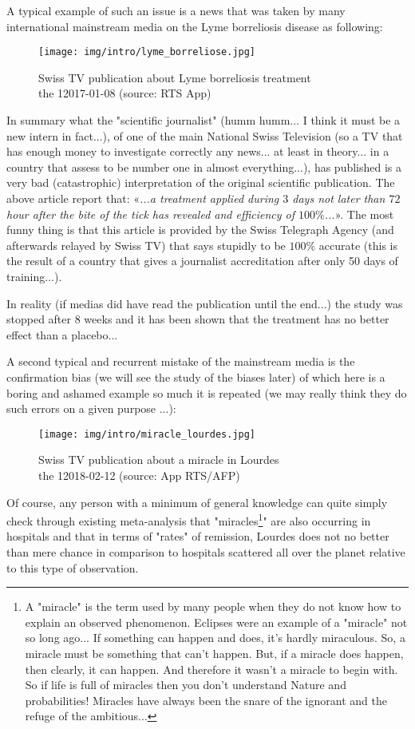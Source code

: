 	A typical example of such an issue is a news that was taken by many international mainstream media on the Lyme borreliosis disease as following:
	\begin{figure}[H]
		\centering
		\texttt{[image: img/intro/lyme\_borreliose.jpg]}
		\vspace*{3mm}
		\caption[Swiss TV publication about Lyme borreliosis treatment]{Swiss TV publication about Lyme borreliosis treatment\\ the 12017-01-08 (source: RTS App)}
	\end{figure}
	In summary what the "scientific journalist" (humm humm... I think it must be a new intern in fact...), of one of the main National Swiss Television (so a TV that has enough money to investigate correctly any news... at least in theory... in a country that assess to be number one in almost everything...), has published is a very bad (catastrophic) interpretation of the original scientific publication. The above article report that: «\textit{...a treatment applied during $3$ days not later than $72$ hour after the bite of the tick has revealed and efficiency of $100\%$...}». The most funny thing is that this article is provided by the Swiss Telegraph Agency (and afterwards relayed by Swiss TV) that says stupidly to be $100\%$ accurate (this is the result of a country that gives a journalist accreditation after only 50 days of training...).
	
	In reality (if medias did have read the publication until the end...) the study was stopped after $8$ weeks and it has been shown that the treatment has no better effect than a placebo...
	
	A second typical and recurrent mistake of the mainstream media is the confirmation bias (we will see the study of the biases later) of which here is a boring and ashamed example so much it is repeated (we may really think they do such errors on a given purpose ...):
	\begin{figure}[H]
		\centering
		\texttt{[image: img/intro/miracle\_lourdes.jpg]}
		\vspace*{3mm}
		\caption[Swiss TV  publication about a miracle in Lourdes]{Swiss TV publication about a miracle in Lourdes\\ the 12018-02-12 (source: App RTS/AFP)}
	\end{figure}
	Of course, any person with a minimum of general knowledge can quite simply check through existing meta-analysis that "miracles\footnote{A "miracle" is the term used by many people when they do not know how to explain an observed phenomenon. Eclipses were an example of a "miracle" not so long ago... If something can happen and does, it's hardly miraculous. So, a miracle must be something that can't happen. But, if a miracle does happen, then clearly, it can happen. And therefore it wasn't a miracle to begin with. So if life is full of miracles then you don't understand Nature and probabilities! Miracles have always been the snare of the ignorant and the refuge of the ambitious...}" are also occurring in hospitals and that in terms of "rates" of remission, Lourdes does not no better than mere chance in comparison to hospitals scattered all over the planet relative to this type of observation.


